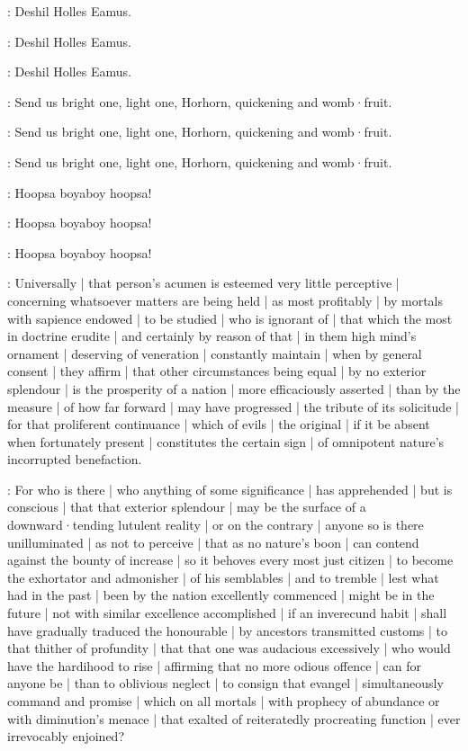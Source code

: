 
:
Deshil Holles Eamus.

:
Deshil Holles Eamus.

:
Deshil Holles Eamus.

:
Send us bright one,
light one,
Horhorn,
quickening and womb·fruit.

:
Send us bright one,
light one,
Horhorn,
quickening and womb·fruit.

:
Send us bright one,
light one,
Horhorn,
quickening and womb·fruit.

\nursecallan:
Hoopsa boyaboy hoopsa!

\Nurses:
Hoopsa boyaboy hoopsa!

\All:
Hoopsa boyaboy hoopsa!

\begin{omitted}


:
Universally |
that person's acumen is esteemed very little perceptive |
concerning whatsoever matters are being held |
as most profitably |
by mortals with sapience endowed |
to be studied |
who is ignorant of |
that which the most in doctrine erudite |
and certainly by reason of that |
in them high mind's ornament |
deserving of veneration |
constantly maintain |
when by general consent |
they affirm |
that other circumstances being equal |
by no exterior splendour |
is the prosperity of a nation |
more efficaciously asserted |
than by the measure |
of how far forward |
may have progressed |
the tribute of its solicitude |
for that proliferent continuance |
which of evils |
the original |
if it be absent when fortunately present |
constitutes the certain sign |
of omnipotent nature's incorrupted benefaction.

:
For who is there |
who anything of some significance |
has apprehended |
but is conscious |
that that exterior splendour |
may be the surface of a downward·tending lutulent reality |
or on the contrary |
anyone so is there unilluminated |
as not to perceive |
that as no nature's boon |
can contend against the bounty of increase |
so it behoves every most just citizen |
to become the exhortator and admonisher |
of his semblables |
and to tremble |
lest what had in the past |
been by the nation excellently commenced |
might be in the future |
not with similar excellence accomplished |
if an inverecund habit |
shall have gradually traduced the honourable |
by ancestors transmitted customs |
to that thither of profundity |
that that one was audacious excessively |
who would have the hardihood to rise |
affirming that no more odious offence |
can for anyone be |
than to oblivious neglect |
to consign that evangel |
simultaneously command and promise |
which on all mortals |
with prophecy of abundance or with diminution's menace |
that exalted of reiteratedly procreating function |
ever irrevocably enjoined?

\end{omitted}


